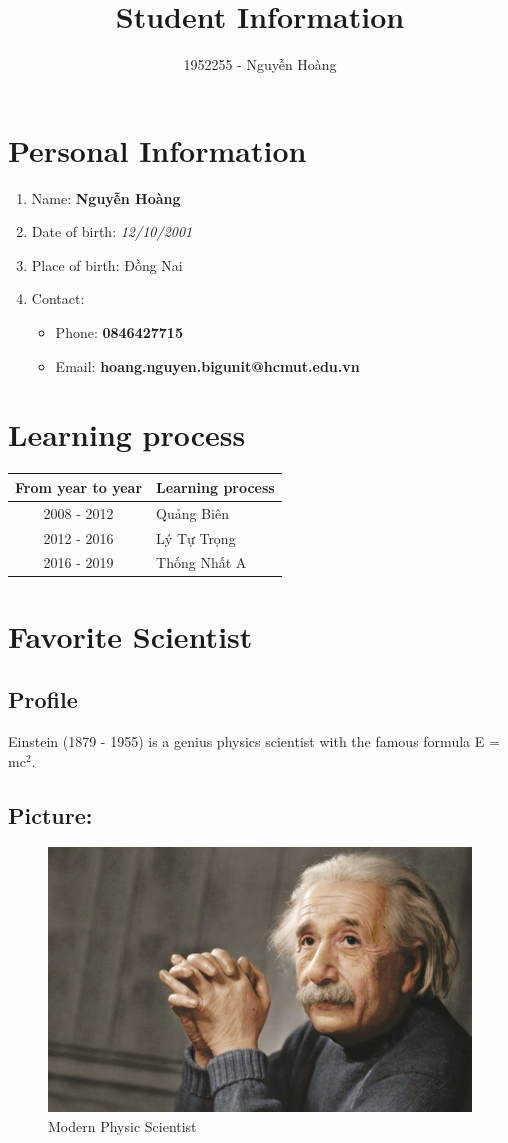 \documentclass[a4paper]{article}
\title{Student Information}
\author{1952255 - Nguyễn Hoàng}
\begin{document}
	\maketitle
	\section{Personal Information}
	\begin{enumerate}
		\item Name: \textbf{Nguyễn Hoàng}
		\item Date of birth: \textit{12/10/2001}
		\item Place of birth: Đồng Nai
		\item Contact:
		\begin{itemize}
			\item Phone: \textbf{0846427715} \\
			\item Email: \textbf{hoang.nguyen.bigunit@hcmut.edu.vn}
		\end{itemize}
	\end{enumerate}
	\section{Learning process}
	\begin{center}
		\label{tab1}
		\begin{tabular}{|c|l|}
			\hline
			From year to year  & Learning process \\
			\hline
			2008 - 2012 & Quảng Biên \\
			\hline
			2012 - 2016 & Lý Tự Trọng \\
			\hline
			2016 - 2019 & Thống Nhất A \\
			\hline
		\end{tabular}
	\end{center}
	\newpage
	\section{Favorite Scientist}
	\subsection{Profile}
	Einstein\cite{barnett2005universe} (1879 - 1955) is a genius physics scientist with the famous formula E = mc$^2$.\\
	\subsection{Picture:}
	\begin{figure}[h]
		\centering
		\includegraphics[width=\linewidth]{albert-einstein-2.jpg}
		\caption{Modern Physic Scientist}
	\end{figure}
	 
	
\end{document}
